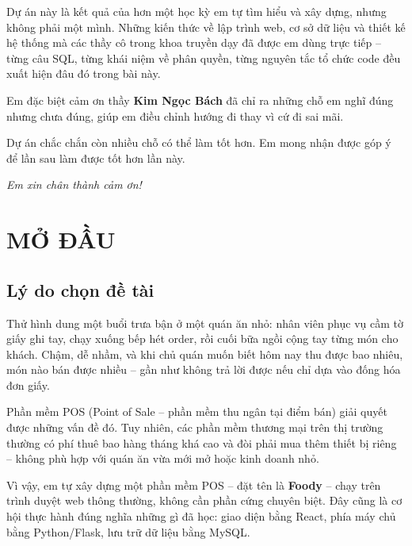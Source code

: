 \documentclass[12pt,a4paper]{report}
\begin{document}
Dự án này là kết quả của hơn một học kỳ em tự tìm hiểu và xây dựng, nhưng không phải một mình. Những kiến thức về lập trình web, cơ sở dữ liệu và thiết kế hệ thống mà các thầy cô trong khoa truyền dạy đã được em dùng trực tiếp -- từng câu SQL, từng khái niệm về phân quyền, từng nguyên tắc tổ chức code đều xuất hiện đâu đó trong bài này.

Em đặc biệt cảm ơn thầy \textbf{Kim Ngọc Bách} đã chỉ ra những chỗ em nghĩ đúng nhưng chưa đúng, giúp em điều chỉnh hướng đi thay vì cứ đi sai mãi.

Dự án chắc chắn còn nhiều chỗ có thể làm tốt hơn. Em mong nhận được góp ý để lần sau làm được tốt hơn lần này.

\vspace{0.5cm}
\begin{flushright}
  \textit{Em xin chân thành cảm ơn!}
\end{flushright}

\tableofcontents

\chapter{MỞ ĐẦU}

\section{Lý do chọn đề tài}

Thử hình dung một buổi trưa bận ở một quán ăn nhỏ: nhân viên phục vụ cầm tờ giấy ghi tay, chạy xuống bếp hét order, rồi cuối bữa ngồi cộng tay từng món cho khách. Chậm, dễ nhầm, và khi chủ quán muốn biết hôm nay thu được bao nhiêu, món nào bán được nhiều -- gần như không trả lời được nếu chỉ dựa vào đống hóa đơn giấy.

Phần mềm POS (Point of Sale -- phần mềm thu ngân tại điểm bán) giải quyết được những vấn đề đó. Tuy nhiên, các phần mềm thương mại trên thị trường thường có phí thuê bao hàng tháng khá cao và đòi phải mua thêm thiết bị riêng -- không phù hợp với quán ăn vừa mới mở hoặc kinh doanh nhỏ.

Vì vậy, em tự xây dựng một phần mềm POS -- đặt tên là \textbf{Foody} -- chạy trên trình duyệt web thông thường, không cần phần cứng chuyên biệt. Đây cũng là cơ hội thực hành đúng nghĩa những gì đã học: giao diện bằng React, phía máy chủ bằng Python/Flask, lưu trữ dữ liệu bằng MySQL.
\end{document}
